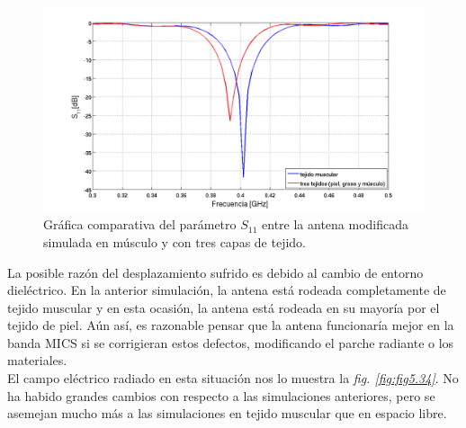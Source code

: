 \begin{figure}[!htb]
    \centering
    \includegraphics[scale=0.45]{./Simulaciones/matlab2/S11_vs_tunned_3layers_muscle_zoom}
    \caption{Gráfica comparativa del parámetro $S_{11}$ entre la antena modificada simulada en músculo y con tres capas de tejido.}
    \label{fig:fig5.33}
\end{figure}

La posible razón del desplazamiento sufrido es debido al cambio de entorno dieléctrico. En la anterior simulación, la antena está rodeada completamente de tejido muscular y en esta ocasión, la antena está rodeada en su mayoría por el tejido de piel. Aún así, es razonable pensar que la antena funcionaría mejor en la banda MICS si se corrigieran estos defectos, modificando el parche radiante o los materiales.\\

El campo eléctrico radiado en esta situación nos lo muestra la \textit{fig. \ref{fig:fig5.34}}. No ha habido grandes cambios con respecto a las simulaciones anteriores, pero se asemejan mucho más a las simulaciones en tejido muscular que en espacio libre.

